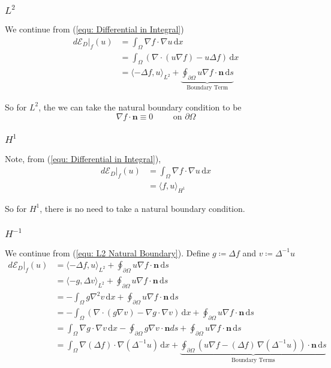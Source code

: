 \documentclass[a4paper]{article}
\newcommand{\dx}{\, \text{d} x}
\newcommand{\ds}{\, \text{d} s}
\theoremstyle{definition}
\begin{document}
\subsubsection{$L^2$}
\label{sct: L2 Natural BC}
We continue from (\ref{equ: Differential in Integral})
\begin{align}
    d \mathcal{E}_D|_f(u) &= \int_{\Omega} \nabla f \cdot \nabla u \dx \\
    &= \int_{\Omega} \left( \nabla \cdot \left( u \nabla f \right) - u \Delta f \right) \dx \\
    &= \langle -\Delta f, u \rangle_{L^2} + \underbrace{\oint_{\partial \Omega} u \nabla f \cdot \mathbf{n} \ds}_{\text{Boundary Term}}
    \label{equ: L2 Natural Boundary}
\end{align}

So for $L^2$, the we can take the natural boundary condition to be
\begin{equation*}
    \nabla f \cdot \mathbf{n} \equiv 0 \hspace{1cm} \text{on } \partial \Omega
\end{equation*}

\subsubsection{$H^1$}
Note, from (\ref{equ: Differential in Integral}),
\begin{align}
    d \mathcal{E}_D|_f(u) &= \int_{\Omega} \nabla f \cdot \nabla u \dx \\
    &= \langle f, u \rangle_{H^1}
\end{align}

So for $H^1$, there is no need to take a natural boundary condition.
\subsubsection{$H^{-1}$}
We continue from (\ref{equ: L2 Natural Boundary}).
Define $g \coloneqq \Delta f$ and $v \coloneqq \Delta^{-1} u$
\begin{align}
    d \mathcal{E}_D|_f(u) &= \langle -\Delta f, u \rangle_{L^2} + \oint_{\partial \Omega} u \nabla f \cdot \mathbf{n} \ds \\
    &= \langle -g, \Delta v \rangle_{L^2} + \oint_{\partial \Omega} u \nabla f \cdot \mathbf{n} \ds \\
    &= -\int_{\Omega} g \nabla^2 v \dx + \oint_{\partial \Omega} u \nabla f \cdot \mathbf{n} \ds \\
    &= -\int_{\Omega} \left( \nabla \cdot \left( g \nabla v \right) - \nabla g \cdot \nabla v \right)  \dx + \oint_{\partial \Omega} u \nabla f \cdot \mathbf{n} \ds \\
    &= \int_{\Omega} \nabla g \cdot \nabla v \dx -\oint_{\partial \Omega} g \nabla v \cdot \mathbf{n} ds + \oint_{\partial \Omega} u \nabla f \cdot \mathbf{n} \ds \\
    &= \int_{\Omega} \nabla \left( \Delta f \right) \cdot \nabla \left( \Delta^{-1} u \right) \dx 
    + \underbrace{\oint_{\partial \Omega} \left( u \nabla f - (\Delta f) \, \nabla \left( \Delta^{-1} u \right) \right) \cdot \mathbf{n} \ds}_{\text{Boundary Terms}}
\end{align}
\end{document}
